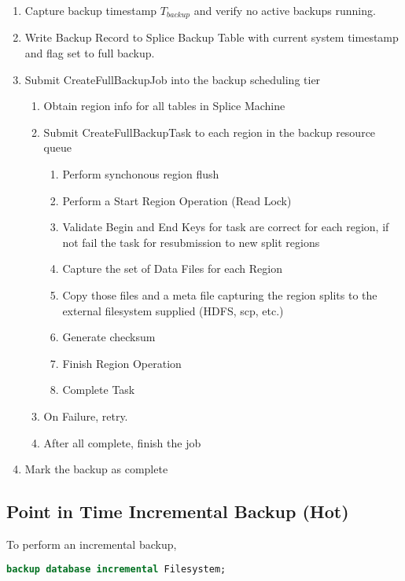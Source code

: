 \begin{enumerate}
	\item Capture backup timestamp $T_{backup}$ and verify no active backups
	running.
	\item Write Backup Record to Splice Backup Table with current system timestamp
	and flag set to full backup.
	\item Submit CreateFullBackupJob into the backup scheduling tier
	\begin{enumerate}
	\item Obtain region info for all tables in Splice Machine
	\item Submit CreateFullBackupTask to each region in the backup resource queue
	\begin{enumerate}
	\item Perform synchonous region flush 
	\item Perform a Start Region Operation (Read Lock)
	\item Validate Begin and End Keys for task are correct for each region, if not
	fail the task for resubmission to new split regions
	\item Capture the set of Data Files for each Region
	\item Copy those files and a meta file capturing the region splits to the
	external filesystem supplied (HDFS, scp, etc.)
	\item Generate checksum
	\item Finish Region Operation
	\item Complete Task
	\end{enumerate}
	\item On Failure, retry.
	\item After all complete, finish the job
	\end{enumerate}
	\item Mark the backup as complete
\end{enumerate}


\subsection{Point in Time Incremental Backup (Hot)}

To perform an incremental backup,
	
\begin{lstlisting}[frame=single,captionpos=b,language=SQL,caption=Procedure to
Perform an Incremental Backup] 
backup database incremental Filesystem;
\end{lstlisting}

